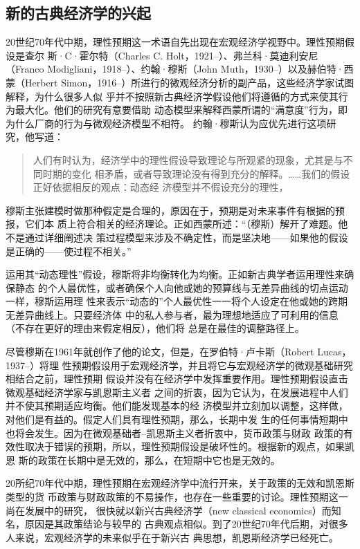 \subsection{新的古典经济学的兴起}

20世纪70年代中期，理性预期这一术语自先出现在宏观经济学视野中。理性预期假设是查尔
斯·C·霍尔特（Charles C. Holt，1921--）、弗兰科·莫迪利安尼 （Franco
Modigliani，1918--）、约翰·穆斯（John Muth，1930--）以及赫伯特·西蒙（Herbert
Simon，1916--）所进行的微观经济分析的副产品，这些经济学家试图解释，为什么很多人似
乎并不按照新古典经济学假设他们将遵循的方式来使其行为最大化。他们的研究有意要借助
动态模型来解释西蒙所谓的“满意度”行为，即为什么厂商的行为与微观经济模型不相符。
约翰·穆斯认为应优先进行这项研究，他写道：

\begin{quotation}
  人们有时认为，经济学中的理性假设导致理论与所观紧的现象，尤其是与不同时期的变化
  相矛盾，或者导致理论没有得到充分的解释。……我们的假设正好依据相反的观点：动态经
  济模型并不假设充分的理性，
\end{quotation}

穆斯主张建模时做那种假定是合理的，原因在于，预期是对未来事件有根据的预报，它们本
质上符合相关的经济理论。正如西蒙所述：“（穆斯）解开了难题。他不是通过详细阐述决
策过程模型来涉及不确定性，而是坚决地——如果他的假设是正确的——使过程不相关。”

运用其“动态理性”假设，穆斯将非均衡转化为均衡。正如新古典学者运用理性来确保静态
的个人最优性，或者确保个人向他或她的预算线与无差异曲线的切点运动一样，穆斯运用理
性来表示“动态的”个人最优性一一将个人设定在他或她的跨期无差异曲线上。只要经济体
中的私人参与者，最为理想地适应了可利用的信息（不存在更好的理由来假定相反），他们将
总是在最佳的调整路径上。

尽管穆斯在1961年就创作了他的论文，但是，在罗伯特·卢卡斯（Robert Lucas，1937--）将理
性预期假设用于宏观经济学，并且将它与宏观经济学的微观基础研究相结合之前，理性预期
假设并没有在经济学中发挥重要作用。理性预期假设直击微观基础经济学家与凯恩斯主义者
之间的折衷，因为它认为，在发展进程中人们并不使其预期适应均衡。他们能发现基本的经
济模型并立刻加以调整，这样做，对他们是有益的。假定人们具有理性预期，那么，长期中发
生的任何事情短期中也将会发生。因为在微观基础者--凯恩斯主义者折衷中，货币政策与财政
政策的有效性取决于错误的预期，所以，理性预期假设是破坏性的。根据新的观点，如果凯恩
斯的政策在长期中是无效的，那么，在短期中它也是无效的。

20所纪70年代中期，理性预期在宏观经济学中流行开来，关于政策的无效和凯恩斯类型的货
币政策与财政政策的不易操作，也存在一些重要的讨论。理性预期这一尚在发展中的研究，
很快就以新兴古典经济学（new classical economics）而知名，原因是其政策结论与较早的
古典观点相似。到了20世纪70年代后期，对很多人来说，宏观经济学的未来似乎在于新兴古
典思想，凯恩斯经济学已经死亡。

